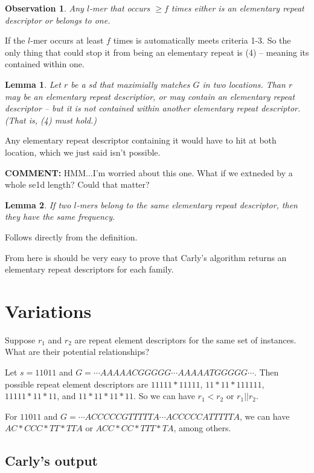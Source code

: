 \documentclass{article}
\newtheorem{observation}{Observation}
\newtheorem{lemma}{Lemma}
\begin{document}
\begin{observation}
  Any $l$-mer that occurs $\geq f$ times either is an elementary
  repeat descriptor or belongs to one.
\end{observation}
If the $l$-mer occurs at least $f$ times is automatically meets
criteria 1-3.  So the only thing that could stop it from being an
elementary repeat is (4) -- meaning its contained within one.

\begin{lemma}
  Let $r$ be a sd that maximially matches $G$ in two locations.  Than
  $r$ may be an elementary repeat descriptior, or may contain an
  elementary repeat descriptor -- but it is not contained within
  another elementary repeat descriptor.  (That is, (4) must hold.)
\end{lemma}
Any elementary repeat descriptor containing it would have to hit at
both location, which we just said isn't possible.

{\bf COMMENT:} HMM...I'm worried about this one.  What if we extneded
by a whole se1d length?  Could that matter?

\begin{lemma}
  If two $l$-mers belong to the same elementary repeat
  descriptor, then they have the same frequency.
  
\end{lemma}
Follows directly from the definition.

From here is should be very easy to prove that Carly's algorithm
returns an elementary repeat descriptors for each family.

\section{Variations}

Suppose $r_1$ and $r_2$ are repeat element descriptors for the same
set of instances.  What are their potential relationships?

Let $s=11011$ and $G = \cdots AAAAACGGGGG \cdots AAAAATGGGGG\cdots$.
Then possible repeat element descriptors are $11111*11111$,
$11*11*111111$, $11111*11*11$, and $11*11*11*11$.  So we can have $r_1
< r_2$ or $r_1 || r_2$.

For $11011$ and $G = \cdots ACCCCCGTTTTTA\cdots ACCCCCATTTTTA$, we can
have $AC*CCC*TT*TTA$ or $ACC*CC*TTT*TA$, among others.

\subsection{Carly's output}
\end{document}
